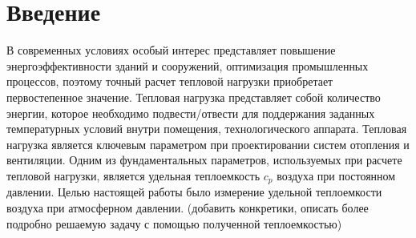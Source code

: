 \section{Введение}

В современных условиях особый интерес представляет повышение энергоэффективности зданий и сооружений, оптимизация промышленных процессов, поэтому точный расчет тепловой нагрузки приобретает первостепенное значение. Тепловая нагрузка представляет собой количество энергии, которое необходимо подвести/отвести для поддержания заданных температурных условий внутри помещения, технологического аппарата. Тепловая нагрузка является ключевым параметром при проектировании систем отопления и вентиляции. Одним из фундаментальных параметров, используемых при расчете тепловой нагрузки, является удельная теплоемкость $c_p$ воздуха при постоянном давлении. Целью настоящей работы было измерение удельной теплоемкости воздуха при атмосферном давлении. (добавить конкретики, описать более подробно решаемую задачу с помощью полученной теплоемкостью)